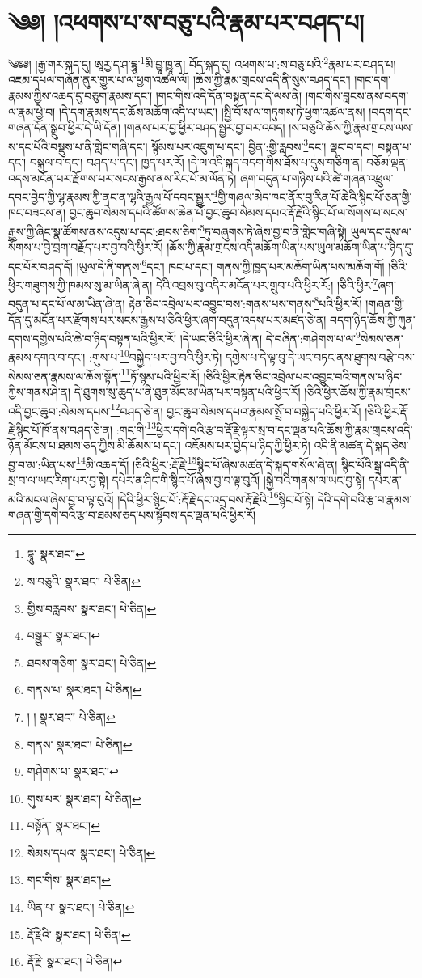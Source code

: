 \setcounter{footnote}{0} 
\chapter{༄༅། །འཕགས་པ་ས་བཅུ་པའི་རྣམ་པར་བཤད་པ།}༄༅༅། །རྒྱ་གར་སྐད་དུ། ཨཱརྱ་ད་ཤ་བྷཱུ་\footnote{དྷཱུ་  སྣར་ཐང་། }མི་བྱཱ་ཁྱཱ་ན། བོད་སྐད་དུ། འཕགས་པ་:ས་བཅུ་པའི་\footnote{ས་བཅུའི་  སྣར་ཐང་།  པེ་ཅིན། }རྣམ་པར་བཤད་པ། འཇམ་དཔལ་གཞོན་ནུར་གྱུར་པ་ལ་ཕྱག་འཚལ་ལོ། །ཆོས་ཀྱི་རྣམ་གྲངས་འདི་ནི་སུས་བཤད་དང་། །གང་དག་རྣམས་ཀྱིས་འཆད་དུ་བཅུག་རྣམས་དང་། །གང་གིས་འདི་དོན་བསྟན་དང་དེ་ལས་ནི། །གང་གིས་བླངས་ནས་བདག་ལ་རྣམ་ཕྱེ་བ། །དེ་དག་རྣམས་དང་ཆོས་མཆོག་འདི་ལ་ཡང་། །སྤྱི་བོ་ས་ལ་གཏུགས་ཏེ་ཕྱག་འཚལ་ནས། །བདག་དང་གཞན་དོན་སྒྲུབ་ཕྱིར་དེ་ཡི་དོན། །གནས་པར་བྱ་ཕྱིར་བཤད་སྦྱར་བྱ་བར་འབད། །ས་བཅུའི་ཆོས་ཀྱི་རྣམ་གྲངས་ལས་ས་དང་པོའི་བསྡུས་པ་ནི་གླེང་གཞི་དང་། སྙོམས་པར་འཇུག་པ་དང་། བྱིན་:གྱི་རླབས་\footnote{གྱིས་བརླབས་  སྣར་ཐང་།  པེ་ཅིན། }དང་། ལྡང་བ་དང་། བསྟན་པ་དང་། བསྐུལ་བ་དང་། བཤད་པ་དང་། ཁྱད་པར་རོ། །དེ་ལ་འདི་སྐད་བདག་གིས་ཐོས་པ་དུས་གཅིག་ན། བཅོམ་ལྡན་འདས་མངོན་པར་རྫོགས་པར་སངས་རྒྱས་ནས་རིང་པོ་མ་ལོན་ཏེ། ཞག་བདུན་པ་གཉིས་པའི་ཚེ་གཞན་འཕྲུལ་དབང་བྱེད་ཀྱི་ལྷ་རྣམས་ཀྱི་ནང་ན་ལྷའི་རྒྱལ་པོ་དབང་སྒྱུར་\footnote{བསྒྱུར་  སྣར་ཐང་། }གྱི་གཞལ་མེད་ཁང་ནོར་བུ་རིན་པོ་ཆེའི་སྙིང་པོ་ཅན་གྱི་ཁང་བཟངས་ན། བྱང་ཆུབ་སེམས་དཔའི་ཚོགས་ཆེན་པོ་བྱང་ཆུབ་སེམས་དཔའ་རྡོ་རྗེའི་སྙིང་པོ་ལ་སོགས་པ་སངས་རྒྱས་ཀྱི་ཞིང་སྣ་ཚོགས་ནས་འདུས་པ་དང་:ཐབས་ཅིག་\footnote{ཐབས་གཅིག་  སྣར་ཐང་།  པེ་ཅིན། }ཏུ་བཞུགས་ཏེ་ཞེས་བྱ་བ་ནི་གླེང་གཞི་སྟེ། ཡུལ་དང་དུས་ལ་སོགས་པ་བྱེ་བྲག་བརྗོད་པར་བྱ་བའི་ཕྱིར་རོ། །ཆོས་ཀྱི་རྣམ་གྲངས་འདི་མཆོག་ཡིན་པས་ཡུལ་མཆོག་ཡིན་པ་ཉིད་དུ་དང་པོར་བཤད་དོ། །ཡུལ་དེ་ནི་གནས་\footnote{གནས་པ་  སྣར་ཐང་།  པེ་ཅིན། }དང་། ཁང་པ་དང་། གནས་ཀྱི་ཁྱད་པར་མཆོག་ཡིན་པས་མཆོག་གོ། །ཅིའི་ཕྱིར་གཟུགས་ཀྱི་ཁམས་སུ་མ་ཡིན་ཞེ་ན། དེའི་འབྲས་བུ་འདིར་མངོན་པར་གྲུབ་པའི་ཕྱིར་རོ:། །ཅིའི་ཕྱིར་\footnote{། །  སྣར་ཐང་།  པེ་ཅིན། }ཞག་བདུན་པ་དང་པོ་ལ་མ་ཡིན་ཞེ་ན། རྟེན་ཅིང་འབྲེལ་པར་འབྱུང་བས་:གནས་པས་གནས་\footnote{གནས་  སྣར་ཐང་།  པེ་ཅིན། }པའི་ཕྱིར་རོ། །གཞན་གྱི་དོན་དུ་མངོན་པར་རྫོགས་པར་སངས་རྒྱས་པ་ཅིའི་ཕྱིར་ཞག་བདུན་འདས་པར་མཛད་ཅེ་ན། བདག་ཉིད་ཆོས་ཀྱི་ཀུན་དགས་དགྱེས་པའི་ཆེ་བ་ཉིད་བསྟན་པའི་ཕྱིར་རོ། །དེ་ཡང་ཅིའི་ཕྱིར་ཞེ་ན། དེ་བཞིན་:གཤེགས་པ་ལ་\footnote{གཤེགས་པ་  སྣར་ཐང་། }སེམས་ཅན་རྣམས་དགའ་བ་དང་། :གུས་པ་\footnote{གུས་པར་  སྣར་ཐང་།  པེ་ཅིན། }བསྐྱེད་པར་བྱ་བའི་ཕྱིར་ཏེ། དགྱེས་པ་དེ་ལྟ་བུ་དེ་ཡང་བཏང་ནས་ཐུགས་བརྩེ་བས་སེམས་ཅན་རྣམས་ལ་ཆོས་སྟོན་\footnote{བསྟོན་  སྣར་ཐང་། }ཏོ་སྙམ་པའི་ཕྱིར་རོ། །ཅིའི་ཕྱིར་རྟེན་ཅིང་འབྲེལ་པར་འབྱུང་བའི་གནས་པ་ཉིད་ཀྱིས་གནས་ཤེ་ན། དེ་ཐུགས་སུ་ཆུད་པ་ནི་ཐུན་མོང་མ་ཡིན་པར་བསྟན་པའི་ཕྱིར་རོ། །ཅིའི་ཕྱིར་ཆོས་ཀྱི་རྣམ་གྲངས་འདི་བྱང་ཆུབ་:སེམས་དཔས་\footnote{སེམས་དཔའ་  སྣར་ཐང་།  པེ་ཅིན། }བཤད་ཅེ་ན། བྱང་ཆུབ་སེམས་དཔའ་རྣམས་སྤྲོ་བ་བསྐྱེད་པའི་ཕྱིར་རོ། །ཅིའི་ཕྱིར་རྡོ་རྗེ་སྙིང་པོ་ཁོ་ནས་བཤད་ཅེ་ན། :གང་གི་\footnote{གང་གིས་  སྣར་ཐང་། }ཕྱིར་དགེ་བའི་རྩ་བ་རྡོ་རྗེ་ལྟར་སྲ་བ་དང་ལྡན་པའི་ཆོས་ཀྱི་རྣམ་གྲངས་འདི་ཉོན་མོངས་པ་ཐམས་ཅད་ཀྱིས་མི་ཆོམས་པ་དང་། འཇོམས་པར་བྱེད་པ་ཉིད་ཀྱི་ཕྱིར་ཏེ། འདི་ནི་མཚན་དེ་སྐད་ཅེས་བྱ་བ་མ་:ཡིན་པས་\footnote{ཡིན་པ་  སྣར་ཐང་།  པེ་ཅིན། }མི་འཆད་དོ། །ཅིའི་ཕྱིར་:རྡོ་རྗེ་\footnote{རྡོ་རྗེའི་  སྣར་ཐང་།  པེ་ཅིན། }སྙིང་པོ་ཞེས་མཚན་དེ་སྐད་གསོལ་ཞེ་ན། སྙིང་པོའི་སྒྲ་འདི་ནི་སྲ་བ་ལ་ཡང་རིག་པར་བྱ་སྟེ། དཔེར་ན་ཤིང་གི་སྙིང་པོ་ཞེས་བྱ་བ་ལྟ་བུའོ། །སྐྱེ་བའི་གནས་ལ་ཡང་བྱ་སྟེ། དཔེར་ན་མའི་མངལ་ཞེས་བྱ་བ་ལྟ་བུའོ། །དེའི་ཕྱིར་སྙིང་པོ་:རྡོ་རྗེ་དང་འདྲ་བས་རྡོ་རྗེའི་\footnote{རྡོ་རྗེ་  སྣར་ཐང་།  པེ་ཅིན། }སྙིང་པོ་སྟེ། དེའི་དགེ་བའི་རྩ་བ་རྣམས་གཞན་གྱི་དགེ་བའི་རྩ་བ་ཐམས་ཅད་པས་སྟོབས་དང་ལྡན་པའི་ཕྱིར་རོ། 